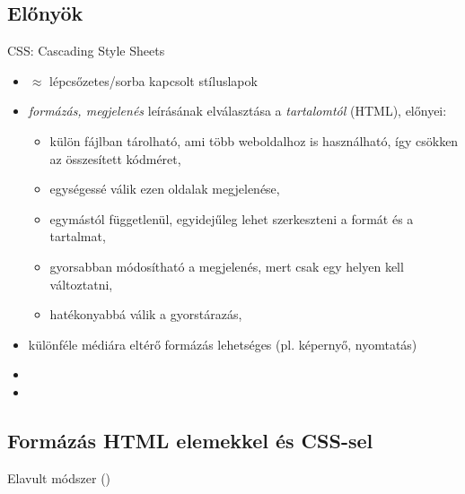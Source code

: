
\subsection{Előnyök}

\begin{frame}
  CSS: Cascading Style Sheets
  \begin{itemize}
    \item $\approx$ lépcsőzetes/sorba kapcsolt stíluslapok
    \item \emph{formázás, megjelenés} leírásának elválasztása a \emph{tartalomtól} (HTML), előnyei:
    \begin{itemize}
      \item külön fájlban tárolható, ami több weboldalhoz is használható, így csökken az összesített kódméret, 
      \item egységessé válik ezen oldalak megjelenése,
      \item egymástól függetlenül, egyidejűleg lehet szerkeszteni a formát és a tartalmat,
      \item gyorsabban módosítható a megjelenés, mert csak egy helyen kell változtatni,
      \item hatékonyabbá válik a gyorstárazás,
    \end{itemize}
    \item különféle médiára eltérő formázás lehetséges (pl. képernyő, nyomtatás)
    \item {}
    \item {}
  \end{itemize}
\end{frame}

\subsection{Formázás HTML elemekkel és CSS-sel}

\begin{frame}
  \small
  \begin{alertblock}{Elavult módszer ()}
    
  \end{alertblock}
\end{frame}


